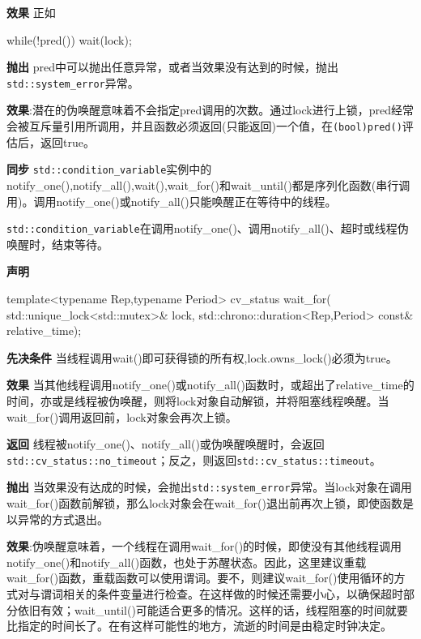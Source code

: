 \textbf{效果}
正如

\begin{cpp}
while(!pred())
{
  wait(lock);
}
\end{cpp}

\textbf{抛出}
pred中可以抛出任意异常，或者当效果没有达到的时候，抛出\texttt{std::system\_error}异常。

\textbf{效果}:潜在的伪唤醒意味着不会指定pred调用的次数。通过lock进行上锁，pred经常会被互斥量引用所调用，并且函数必须返回(只能返回)一个值，在\texttt{(bool)pred()}评估后，返回true。

\textbf{同步}
\texttt{std::condition\_variable}实例中的notify\_one(),notify\_all(),wait(),wait\_for()和wait\_until()都是序列化函数(串行调用)。调用notify\_one()或notify\_all()只能唤醒正在等待中的线程。


\texttt{std::condition\_variable}在调用notify\_one()、调用notify\_all()、超时或线程伪唤醒时，结束等待。

\textbf{声明}

\begin{cpp}
template<typename Rep,typename Period>
cv_status wait_for(
    std::unique_lock<std::mutex>& lock,
    std::chrono::duration<Rep,Period> const& relative_time);
\end{cpp}

\textbf{先决条件}
当线程调用wait()即可获得锁的所有权,lock.owns\_lock()必须为true。

\textbf{效果}
当其他线程调用notify\_one()或notify\_all()函数时，或超出了relative\_time的时间，亦或是线程被伪唤醒，则将lock对象自动解锁，并将阻塞线程唤醒。当wait\_for()调用返回前，lock对象会再次上锁。

\textbf{返回}
线程被notify\_one()、notify\_all()或伪唤醒唤醒时，会返回\texttt{std::cv\_status::no\_timeout}；反之，则返回\texttt{std::cv\_status::timeout}。

\textbf{抛出}
当效果没有达成的时候，会抛出\texttt{std::system\_error}异常。当lock对象在调用wait\_for()函数前解锁，那么lock对象会在wait\_for()退出前再次上锁，即使函数是以异常的方式退出。

\textbf{效果}:伪唤醒意味着，一个线程在调用wait\_for()的时候，即使没有其他线程调用notify\_one()和notify\_all()函数，也处于苏醒状态。因此，这里建议重载wait\_for()函数，重载函数可以使用谓词。要不，则建议wait\_for()使用循环的方式对与谓词相关的条件变量进行检查。在这样做的时候还需要小心，以确保超时部分依旧有效；wait\_until()可能适合更多的情况。这样的话，线程阻塞的时间就要比指定的时间长了。在有这样可能性的地方，流逝的时间是由稳定时钟决定。

